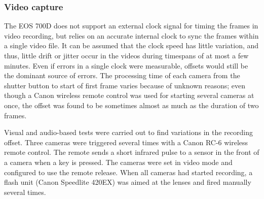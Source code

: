 
%

\subsubsection{Video capture}


The EOS 700D does not support an external clock signal for timing the frames in video recording, but relies on an accurate internal clock to sync the frames within a single video file.
It can be assumed that the clock speed has little variation, and thus, little drift or jitter occur in the videos during timespans of at most a few minutes.
Even if errors in a single clock were measurable, offsets would still be the dominant source of errors.
The processing time of each camera from the shutter button to start of first frame varies because of unknown reasons; even though a Canon wireless remote control was used for starting several cameras at once, the offset was found to be sometimes almost as much as the duration of two frames.


Visual and audio-based tests were carried out to find variations in the recording offset.
Three cameras were triggered several times with a Canon RC-6 wireless remote control.
The remote sends a short infrared pulse to a sensor in the front of a camera when a key is pressed.
The cameras were set in video mode and configured to use the remote release.
When all cameras had started recording, a flash unit (Canon Speedlite 420EX) was aimed at the lenses and fired manually several times.

